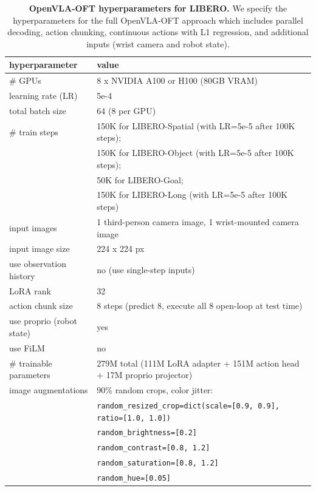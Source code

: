 \documentclass[conference]{IEEEtran}
\begin{document}
\begin{table}
\centering
\caption{\textbf{OpenVLA-OFT hyperparameters for LIBERO.} We specify the hyperparameters for the full OpenVLA-OFT approach which includes parallel decoding, action chunking, continuous actions with L1 regression, and additional inputs (wrist camera and robot state).}
\label{tab:openvla_oft_hyperparameters_libero}
\begin{tabular}{ll}
\toprule
hyperparameter & value \\
\midrule
\# GPUs & 8 x NVIDIA A100 or H100 (80GB VRAM) \\
learning rate (LR) & 5e-4 \\
total batch size & 64 (8 per GPU) \\
\# train steps & 150K for LIBERO-Spatial (with LR=5e-5 after 100K steps); \\
& 150K for LIBERO-Object (with LR=5e-5 after 100K steps); \\
& 50K for LIBERO-Goal; \\
& 150K for LIBERO-Long (with LR=5e-5 after 100K steps) \\
input images & 1 third-person camera image, 1 wrist-mounted camera image \\
input image size & 224 x 224 px \\
use observation history & no (use single-step inputs) \\
LoRA rank & 32 \\
action chunk size & 8 steps (predict 8, execute all 8 open-loop at test time) \\
use proprio (robot state) & yes \\
use FiLM & no \\
\# trainable parameters & 279M total (111M LoRA adapter + 151M action head + 17M proprio projector) \\
image augmentations & 90\% random crops, color jitter: \\
& \;\; \texttt{random\_resized\_crop=dict(scale=[0.9, 0.9], ratio=[1.0, 1.0])} \\
& \;\; \texttt{random\_brightness=[0.2]} \\
& \;\; \texttt{random\_contrast=[0.8, 1.2]} \\
& \;\; \texttt{random\_saturation=[0.8, 1.2]} \\
& \;\; \texttt{random\_hue=[0.05]} \\
\bottomrule
\end{tabular}
\end{table}
\end{document}
